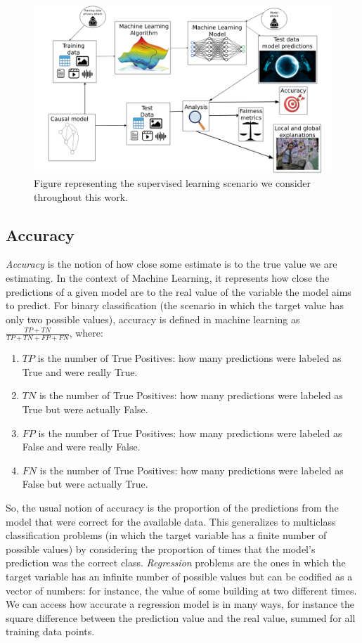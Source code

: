 \begin{figure}[ht]
\centering
\includegraphics[width=\textwidth]{EverythingEAAO}
\caption{Figure representing the supervised learning scenario we consider throughout this work.}\label{fig:EEAAO}
\end{figure}

\subsection{Accuracy}

\emph{Accuracy} is the notion of how close some estimate is to the true value we are estimating. In the context of Machine Learning, it represents how close the predictions of a given model are to the real value of the variable the model aims to predict. For binary classification (the scenario in which the target value has only two possible values), accuracy is defined in machine learning as $\frac{TP+TN}{TP+TN+FP+FN}$, where:

\begin{enumerate}
\item $TP$ is the number of True Positives: how many predictions were labeled as True and were really True.
\item $TN$ is the number of True Positives: how many predictions were labeled as True but were actually False.
\item $FP$ is the number of True Positives: how many predictions were labeled as False and were really False.
\item $FN$ is the number of True Positives: how many predictions were labeled as False but were actually True.
\end{enumerate}

So, the usual notion of accuracy is the proportion of the predictions from the model that were correct for the available data. This generalizes to multiclass classification problems (in which the target variable has a finite number of possible values) by considering the proportion of times that the model's prediction was the correct class. \emph{Regression} problems are the ones in which the target variable has an infinite number of possible values but can be codified as a vector of numbers: for instance, the value of some building at two different times. We can access how accurate a regression model is in many ways, for instance the square difference between the prediction value and the real value, summed for all training data points.


